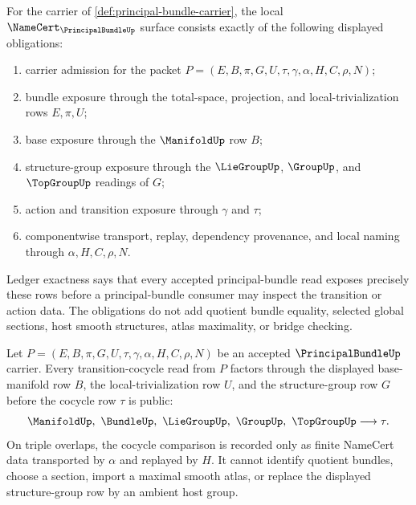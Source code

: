 \begin{theorem}
\label{thm:principal-bundle-namecert-obligations}
For the carrier of \autoref{def:principal-bundle-carrier}, the local $\NameCert_{\PrincipalBundleUp}$ surface consists exactly of the following displayed obligations:
\begin{enumerate}
\item carrier admission for the packet $P=(E,B,\pi,G,U,\tau,\gamma,\alpha,H,C,\rho,N)$;
\item bundle exposure through the total-space, projection, and local-trivialization rows $E,\pi,U$;
\item base exposure through the $\ManifoldUp$ row $B$;
\item structure-group exposure through the $\LieGroupUp$, $\GroupUp$, and $\TopGroupUp$ readings of $G$;
\item action and transition exposure through $\gamma$ and $\tau$;
\item componentwise transport, replay, dependency provenance, and local naming through $\alpha,H,C,\rho,N$.
\end{enumerate}
Ledger exactness says that every accepted principal-bundle read exposes precisely these rows before a principal-bundle consumer may inspect the transition or action data. The obligations do not add quotient bundle equality, selected global sections, host smooth structures, atlas maximality, or bridge checking.
\end{theorem}

\begin{theorem}
\label{thm:principal-bundle-transition-cocycle}
Let $P=(E,B,\pi,G,U,\tau,\gamma,\alpha,H,C,\rho,N)$ be an accepted $\PrincipalBundleUp$ carrier. Every transition-cocycle read from $P$ factors through the displayed base-manifold row $B$, the local-trivialization row $U$, and the structure-group row $G$ before the cocycle row $\tau$ is public:
$$
\ManifoldUp,\ \BundleUp,\ \LieGroupUp,\ \GroupUp,\ \TopGroupUp \longrightarrow \tau .
$$
On triple overlaps, the cocycle comparison is recorded only as finite NameCert data transported by $\alpha$ and replayed by $H$. It cannot identify quotient bundles, choose a section, import a maximal smooth atlas, or replace the displayed structure-group row by an ambient host group.
\end{theorem}


